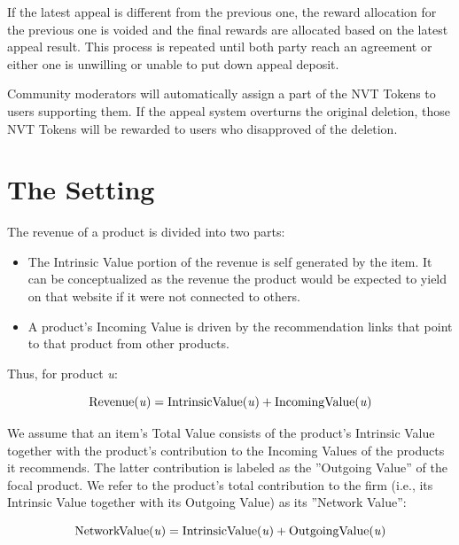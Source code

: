 If the latest appeal is different from the previous one, the reward allocation for the previous one is voided and the final rewards are allocated based on the latest appeal result. This process is repeated until both party reach an agreement or either one is unwilling or unable to put down appeal deposit.

Community moderators will automatically assign a part of the NVT Tokens to users supporting them. If the appeal system overturns the original deletion, those NVT Tokens will be rewarded to users who disapproved of the deletion.


\section{The Setting}

The revenue of a product is divided into two parts:

\begin{itemize}
\item The Intrinsic Value portion of the revenue is self generated by the item. It can be conceptualized as the revenue the product would be expected to yield on that website if it were not connected to others.
\item A product’s Incoming Value is driven by the recommendation links that point to that product from other products.
\end{itemize}

Thus, for product \textit{u}:

\begin{equation}
\textrm{Revenue(\textit{u})} = \textrm{IntrinsicValue(\textit{u})} + \textrm{IncomingValue(\textit{u})}
\end{equation}

We assume that an item’s Total Value consists of the product’s Intrinsic Value together with the product’s contribution to the Incoming Values of the products it recommends. The latter contribution is labeled as the ”Outgoing Value” of the focal product. We refer to the product’s total contribution to the firm (i.e., its Intrinsic Value together with its Outgoing Value) as its ”Network Value”:

\begin{equation}
\textrm{NetworkValue(\textit{u})} = \textrm{IntrinsicValue(\textit{u})} + \textrm{OutgoingValue(\textit{u})}
\end{equation}

